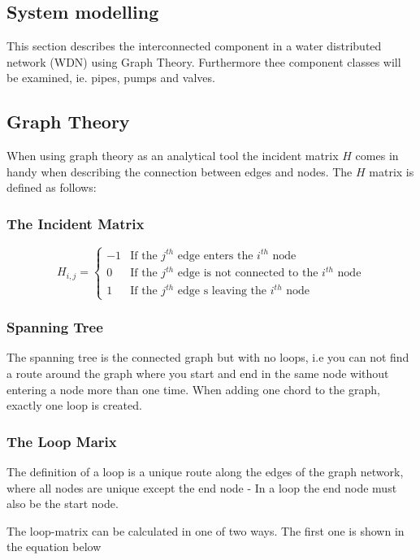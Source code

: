 \subsection{System modelling }
This section describes the interconnected component in a water distributed network (WDN) using Graph Theory. Furthermore thee component classes will be examined, ie. pipes, pumps and valves.


\subsection{Graph Theory}
When using graph theory as an analytical tool the incident matrix $H$ comes in handy when describing the connection between edges and nodes. The $H$ matrix is defined as follows: 

\subsubsection{The Incident Matrix}
\begin{equation}
	H_{i,j} = \begin{cases}
		-1 & \text{If the $j^{th}$ edge enters the $i^{th}$ node} \\
		0 & \text{If the $j^{th}$ edge is not connected to the $i^{th}$ node} \\
		1 & \text{If the $j^{th}$ edge s leaving the $i^{th}$ node}
	\end{cases}
\end{equation} %

\subsubsection{Spanning Tree}
The spanning tree is the connected graph but with no loops, i.e you can not find a route around the graph where you start and end in the same node without entering a node more than one time. 
When adding one chord to the graph, exactly one loop is created.


\subsubsection{The Loop Marix}
The definition of a loop is a unique route along the edges of the graph network, where all nodes are unique except the end node - In a loop the end node must also be the start node.

The loop-matrix can be calculated in one of two ways. The first one is shown in the equation below

